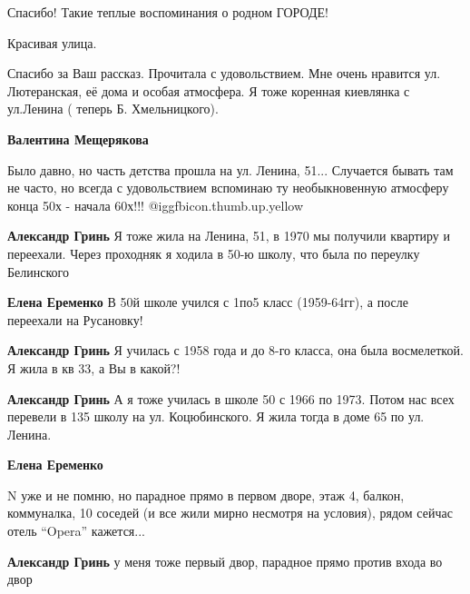  
 
 
 
 
\zzSecCmt

\begin{itemize} %
Спасибо! Такие теплые воспоминания о родном ГОРОДЕ!


Красивая улица.


Спасибо за Ваш рассказ. Прочитала с удовольствием. Мне очень нравится ул.
Лютеранская, её дома и особая атмосфера. Я тоже коренная киевлянка с ул.Ленина
( теперь Б. Хмельницкого).

\begin{itemize} %
\textbf{Валентина Мещерякова} 

Было давно, но часть детства прошла на ул. Ленина, 51... Случается бывать там не
часто, но всегда с удовольствием вспоминаю ту необыкновенную атмосферу конца
50х - начала 60х!!! @igg{fbicon.thumb.up.yellow} 

\textbf{Александр Гринь} Я тоже жила на Ленина, 51, в 1970 мы получили квартиру и переехали. Через проходняк я ходила в 50-ю школу, что была по переулку Белинского

\textbf{Елена Еременко} В 50й школе учился с 1по5 класс (1959-64гг), а после переехали на Русановку!

\textbf{Александр Гринь} Я училась с 1958 года и до 8-го класса, она была восмелеткой.
Я жила в кв 33, а Вы в какой?!

\textbf{Александр Гринь} А я тоже училась в школе 50 с 1966 по 1973. Потом нас всех перевели в 135 школу на ул. Коцюбинского. Я жила тогда в доме 65 по ул. Ленина.

\textbf{Елена Еременко} 

N уже и не помню, но парадное прямо в первом дворе, этаж 4, балкон, коммуналка,
10 соседей (и все жили мирно несмотря на условия), рядом сейчас отель \enquote{Opera}
кажется...


\textbf{Александр Гринь} у меня тоже первый двор, парадное прямо против входа во двор


\end{itemize}
\end{itemize}
